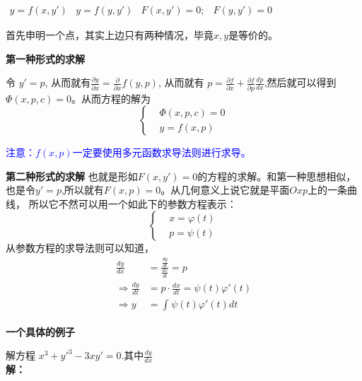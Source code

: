 \documentclass[fontset=windows]{article}
\begin{document}
     $
     \begin{array}{cccc}
        y = f(x, y') & y = f(y, y')& F(x, y')= 0; & F(y, y')= 0
     \end{array}
     $

     首先申明一个点，其实上边只有两种情况，毕竟$x, y$是等价的。

     \textbf{第一种形式的求解}

     令 $y' = p$, 从而就有$\frac{\partial y}{\partial x} = \frac{\partial }{\partial x}f(y, p)$, 从而就有
     $p = \frac{\partial f}{\partial x}+\frac{\partial f}{\partial p}\frac{dp}{dx}$,然后就可以得到$\Phi(x, p, c)=0$。从而方程的解为
     \[\begin{cases}
         &\Phi(x, p, c) = 0\\
         &y = f(x, p)
     \end{cases}\]

     \textcolor{blue}{注意：$f(x, p)$一定要使用多元函数求导法则进行求导。}

     \textbf{第二种形式的求解}
     也就是形如$F(x, y')= 0$的方程的求解。和第一种思想相似，也是令$y'=  p$,所以就有$F(x, p) = 0 $。从几何意义上说它就是平面$Oxp$上的一条曲线， 所以它不然可以用一个如此下的参数方程表示：
     \[\begin{cases}
         &x = \varphi(t)\\
         &p = \psi(t)
     \end{cases}\]
     从参数方程的求导法则可以知道，
     \begin{align*}
     \frac{dy}{dx}& = \frac{\frac{dy}{dt}} {\frac{dx}{dt}} = p  \\
                \Longrightarrow  \frac{dy }{dt } &= p\cdot \frac{dx }{dt } = \psi(t) \varphi'(t)\\
                \Longrightarrow  y &= \int_{}^{}{\psi (t ) \varphi' (t)dt}
     \end{align*}



   \textbf{ 一个具体的例子}

   解方程 $x^3 + y'^3 - 3 xy'= 0$.其中$\frac{dy }{dx }$\\
   \textbf{解：}
\end{document}
